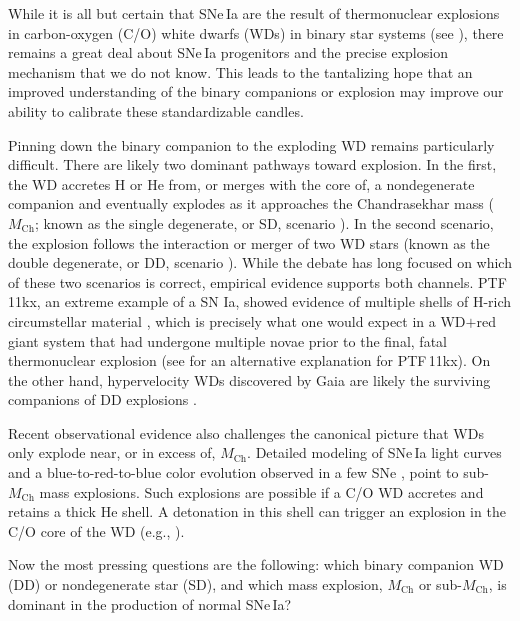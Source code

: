 \documentclass[twocolumn]{./aastex63}
\begin{document}
While it is all but certain that SNe\,Ia are the result of thermonuclear
explosions in carbon-oxygen (C/O) white dwarfs (WDs) in binary star systems
(see \citealt{Maoz14,Livio18}), there remains a great deal about SNe\,Ia
progenitors and the precise explosion mechanism that we do not know. This
leads to the tantalizing hope that an improved understanding of the binary
companions or explosion may improve our ability to calibrate these
standardizable candles.

Pinning down the binary companion to the exploding WD remains particularly
difficult. There are likely two dominant pathways toward explosion. In the
first, the WD accretes H or He from, or merges with the core of, a
nondegenerate companion and eventually explodes as it approaches the
Chandrasekhar mass ($M_\mathrm{Ch}$; known as the single degenerate, or SD,
scenario \citet{Whelan73}). In the second scenario, the explosion follows the
interaction or merger of two WD stars (known as the double degenerate, or DD,
scenario \citet{Webbink84}). While the debate has long focused on which of
these two scenarios is correct, empirical evidence supports both
channels. PTF\,11kx, an extreme example of a SN Ia, showed evidence of
multiple shells of H-rich circumstellar material \citep{Dilday12},
which is precisely what one would expect in a WD$+$red giant system that had
undergone multiple novae prior to the final, fatal thermonuclear explosion
(see \citet{Soker13} for an alternative explanation for PTF\,11kx). On the
other hand, hypervelocity WDs discovered by Gaia are likely the surviving
companions of DD explosions \citep{Shen18}.

Recent observational evidence also challenges the canonical picture
that WDs only explode near, or in excess of, $M_\mathrm{Ch}$. Detailed
modeling of SNe\,Ia light curves \citep{Scalzo14a} and a blue-to-red-to-blue
color evolution observed in a few SNe \citep{Jiang17,De19,Bulla20}, point to
sub-$M_\mathrm{Ch}$ mass explosions. Such explosions are possible if a C/O WD
accretes and retains a thick He shell. A detonation in this shell can trigger
an explosion in the C/O core of the WD (e.g., \citealt{Nomoto82,Nomoto82a}).

Now the most pressing questions are the following: which binary companion WD
(DD) or nondegenerate star (SD), and which mass explosion, $M_\mathrm{Ch}$ or
sub-$M_\mathrm{Ch}$, is dominant in the production of normal SNe\,Ia?
\end{document}
